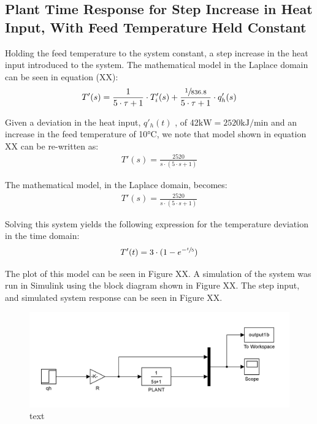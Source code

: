 \documentclass{article}
\begin{document}
\subsection{Plant Time Response for Step Increase in Heat Input, With Feed Temperature Held Constant}
Holding the feed temperature to the system constant, a step increase in the heat input introduced to the system. The mathematical model in the Laplace domain can be seen in equation (XX):
\begin{align}
T'(s) = \frac{1}{5 \cdot \tau + 1} \cdot T'_i(s) + \frac{\sfrac{1}{836.8}}{5 \cdot \tau + 1} \cdot q'_h(s)
\end{align} 

Given a deviation in the heat input, $q'_h(t)$ , of 42$\si{\kilo\watt} = 2520\si{\kilo\joule\per\minute}$ and an increase in the feed temperature of 10$\si{\degreeCelsius}$, we note that model shown in equation XX can be re-written as:
\begin{align}
T'(s) = \frac{2520}{s \cdot (5 \cdot s + 1)}
\end{align}

The mathematical model, in the Laplace domain, becomes:
\begin{align}
T'(s) = \frac{2520}{s \cdot (5 \cdot s + 1)}
\end{align}

Solving this system yields the following expression for the temperature deviation in the time domain:
\begin{align}
T'(t) = 3 \cdot (1 - e^{-\sfrac{t}{5}})
\end{align}

The plot of this model can be seen in Figure XX. A simulation of the system was run in Simulink using the block diagram shown in Figure XX. The step input, and simulated system response can be seen in Figure XX.

\begin{figure}[h]
\centering
\includegraphics[scale=0.2]{block_1b}
\caption{text}
\end{figure}
\end{document}
